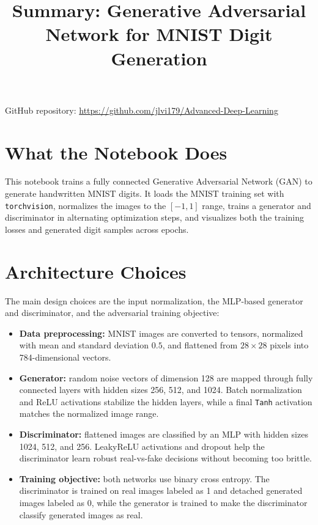 \documentclass[11pt,a4paper]{article}
\title{Summary: Generative Adversarial Network for MNIST Digit Generation}
\author{}
\date{}
\begin{document}
\maketitle

\noindent GitHub repository: \href{https://github.com/jlvi179/Advanced-Deep-Learning}{https://github.com/jlvi179/Advanced-Deep-Learning}

\section*{What the Notebook Does}

This notebook trains a fully connected Generative Adversarial Network (GAN) to generate handwritten MNIST digits. It loads the MNIST training set with \texttt{torchvision}, normalizes the images to the $[-1,1]$ range, trains a generator and discriminator in alternating optimization steps, and visualizes both the training losses and generated digit samples across epochs.

\section*{Architecture Choices}

The main design choices are the input normalization, the MLP-based generator and discriminator, and the adversarial training objective:

\begin{itemize}
    \item \textbf{Data preprocessing:} MNIST images are converted to tensors, normalized with mean and standard deviation $0.5$, and flattened from $28 \times 28$ pixels into 784-dimensional vectors.
    \item \textbf{Generator:} random noise vectors of dimension 128 are mapped through fully connected layers with hidden sizes 256, 512, and 1024. Batch normalization and ReLU activations stabilize the hidden layers, while a final \texttt{Tanh} activation matches the normalized image range.
    \item \textbf{Discriminator:} flattened images are classified by an MLP with hidden sizes 1024, 512, and 256. LeakyReLU activations and dropout help the discriminator learn robust real-vs-fake decisions without becoming too brittle.
    \item \textbf{Training objective:} both networks use binary cross entropy. The discriminator is trained on real images labeled as 1 and detached generated images labeled as 0, while the generator is trained to make the discriminator classify generated images as real.
\end{itemize}
\end{document}
